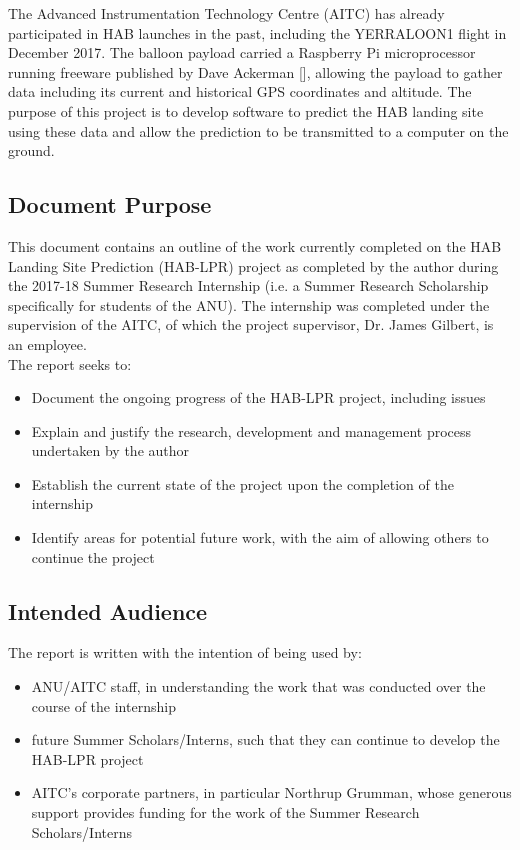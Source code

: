 \documentclass[11pt]{article}
\begin{document}
The Advanced Instrumentation Technology Centre (AITC) has already participated in HAB launches in the past, including the YERRALOON1 flight in December 2017. The balloon payload carried a Raspberry Pi microprocessor running freeware published by Dave Ackerman [], allowing the payload to gather data including its current and historical GPS coordinates and altitude. The purpose of this project is to develop software to predict the HAB landing site using these data and allow the prediction to be transmitted to a computer on the ground.

\subsection{Document Purpose}

This document contains an outline of the work currently completed on the HAB Landing Site Prediction (HAB-LPR) project as completed by the author during the 2017-18 Summer Research Internship (i.e. a Summer Research Scholarship specifically for students of the ANU). The internship was completed under the supervision of the AITC, of which the project supervisor, Dr. James Gilbert, is an employee. \\

The report seeks to:
\begin{itemize}
\item Document the ongoing progress of the HAB-LPR project, including issues
\item Explain and justify the research, development and management process undertaken by the author
\item Establish the current state of the project upon the completion of the internship
\item Identify areas for potential future work, with the aim of allowing others to continue the project
\end{itemize}


\subsection{Intended Audience}
The report is written with the intention of being used by: 
\begin{itemize}
\item ANU/AITC staff, in understanding the work that was conducted over the course of the internship
\item future Summer Scholars/Interns, such that they can continue to develop the HAB-LPR project
\item AITC's corporate partners, in particular Northrup Grumman, whose generous support provides funding for the work of the Summer Research Scholars/Interns
\end{itemize}
\end{document}
